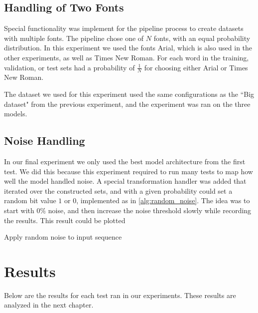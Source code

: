 \subsection{Handling of Two Fonts}
Special functionality was implement for the pipeline process to create datasets with multiple fonts. The pipeline chose one of \(N\) fonts, with an equal probability distribution. In this experiment we used the fonts Arial, which is also used in the other experiments, as well as Times New Roman. For each word in the training, validation, or test sets had a probability of \(\frac{1}{N}\) for choosing either Arial or Times New Roman.

The dataset we used for this experiment used the same configurations as the ``Big dataset" from the previous experiment, and the experiment was ran on the three models.

\subsection{Noise Handling}
In our final experiment we only used the best model architecture from the first test. We did this because this experiment required to run many tests to map how well the model handled noise. A special transformation handler was added that iterated over the constructed sets, and with a given probability could set a random bit value \(1\) or \(0\), implemented as in \ref{alg:random_noise}. The idea was to start with \(0\%\) noise, and then increase the noise threshold slowly while recording the results. This result could be plotted

\begin{algorithm}
    \caption{Apply random noise to input sequence
        \label{alg:random_noise}}
    \begin{algorithmic}[1]
        \Statex
                \EndIf
            \EndFor
        \State {}
        \EndFunction
    \end{algorithmic}
\end{algorithm}


\section{Results}
Below are the results for each test ran in our experiments. These results are analyzed in the next chapter.

